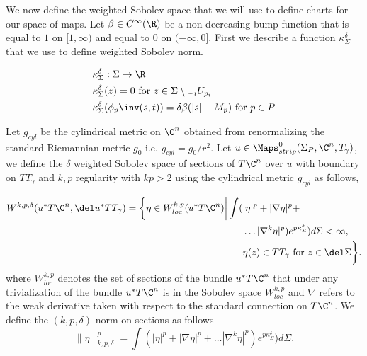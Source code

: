 We now define the weighted Sobolev space that we will use to define charts for our space of maps. Let $\beta \in C^\infty(\R)$ be a non-decreasing bump function that is  equal to $1$ on $[1,\infty)$ and equal to $0$ on $(-\infty,0]$. First we describe a function $\kappa^\delta_\Sigma$ that we use to define weighted Sobolev norm. 

\begin{align*}
    &\kappa^\delta_\Sigma : \Sigma \to \R \\
    &\kappa^\delta_\Sigma (z) = 0 \text{ for  } z \in \Sigma \setminus \cup_i U_{p_i} \\
    &\kappa^\delta_\Sigma (\phi_p \inv (s,t)) = \delta \beta( | s |- M_p) \text{ for } p  \in  P
\end{align*}


\noindent Let $g_{cyl}$ be the cylindrical metric  on $\C^n$ obtained from renormalizing  the standard Riemannian metric $g_0$ i.e. $g_{cyl} = g_0/r^2$. Let $u \in \Maps^0_{strip}(\Sigma_P, \C^n , T_\gamma)$, we define the $\delta$ weighted  Sobolev space of sections of $T\C^n$ over $u$  with boundary on $TT_\gamma$  and $k,p$ regularity with $kp>2$ using the cylindrical metric $g_{cyl}$ as follows,

\begin{align*}
    W^{k,p,\delta} (u^*T\C^n,\del  u^* TT_\gamma) = \bigg \{ \eta \in W_{loc}^{k,p} (u^*T\C^n)   \bigg |  \int (&|\eta|^p + |\nabla \eta |^p  + \\&\dots |\nabla^k \eta|^p)e^{p\kappa^\delta_\Sigma}  ) d\Sigma<\infty,\quad\\ & \eta(z) \in TT_\gamma \text{ for } z\in \del \Sigma  \bigg\}.
\end{align*}
where   $W^{k,p}_{loc}$ denotes the set of sections of  the bundle $u^*T\C^n$ that under any trivialization of the bundle $u^*T\C^n$ is in the Sobolev space $W^{k,p}_{loc}$ and  $\nabla$ refers to the weak derivative taken with respect to the standard connection on $T\C^n$. We define the $(k,p,\delta)$ norm on sections as follows $$\| \eta \|_{k,p,\delta}^p = \int (|\eta|^p + |\nabla \eta |^p  + \dots |\nabla^k \eta|^p)e^{p\kappa^\delta_\Sigma}  ) d\Sigma.$$










